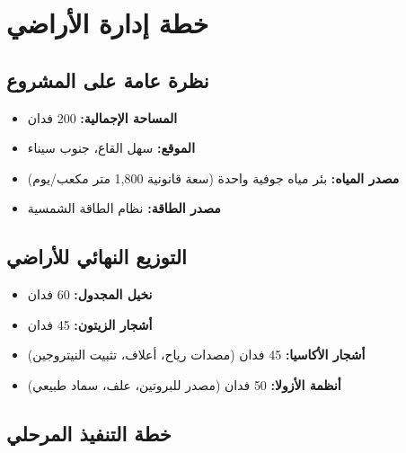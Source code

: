 \section{خطة إدارة الأراضي}

\subsection{نظرة عامة على المشروع}
\begin{itemize}
    \item \textbf{المساحة الإجمالية:} 200 فدان
    \item \textbf{الموقع:} سهل القاع، جنوب سيناء
    \item \textbf{مصدر المياه:} بئر مياه جوفية واحدة (سعة قانونية 1,800 متر مكعب/يوم)
    \item \textbf{مصدر الطاقة:} نظام الطاقة الشمسية
\end{itemize}

\subsection{التوزيع النهائي للأراضي}
\begin{itemize}
    \item \textbf{نخيل المجدول:} 60 فدان
    \item \textbf{أشجار الزيتون:} 45 فدان
    \item \textbf{أشجار الأكاسيا:} 45 فدان (مصدات رياح، أعلاف، تثبيت النيتروجين)
    \item \textbf{أنظمة الأزولا:} 50 فدان (مصدر للبروتين، علف، سماد طبيعي)
\end{itemize}

\subsection{خطة التنفيذ المرحلي}

